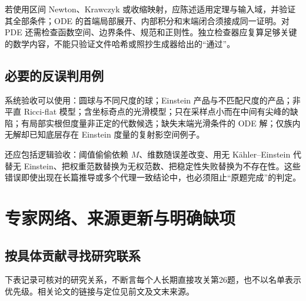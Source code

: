 \documentclass[11pt,a4paper]{article}
\theoremstyle{definition}
\begin{document}
若使用区间 Newton、Krawczyk 或收缩映射，应陈述适用定理与输入域，并验证其全部条件；ODE 的首端局部展开、内部积分和末端闭合须接成同一证明。对 PDE 还需检查函数空间、边界条件、规范和正则性。独立检查器应复算足够关键的数学内容，不能只验证文件哈希或照抄生成器给出的“通过”。

\subsection{必要的反误判用例}

系统验收可以使用：圆球与不同尺度的球；Einstein 产品与不匹配尺度的产品；非平直 Ricci-flat 模型；含坐标奇点的光滑模型；只在采样点小而在中间有尖峰的缺陷；有局部实根但度量非正定的代数候选；缺失末端光滑条件的 ODE 解；仅族内无解却已知底层存在 Einstein 度量的复射影空间例子。

还应包括逻辑验收：阈值偷偷依赖 $M$、维数随误差改变、用无 Kähler--Einstein 代替无 Einstein、把权重范数替换为无权范数、把稳定性失败替换为不存在性。这些错误即使出现在长篇推导或多个代理一致结论中，也必须阻止“原题完成”的判定。

\section{专家网络、来源更新与明确缺项}

\subsection{按具体贡献寻找研究联系}

下表记录可核对的研究关系，不断言每个人长期直接攻关第26题，也不以名单表示优先级。相关论文的链接与定位见前文及文末来源。
\end{document}
